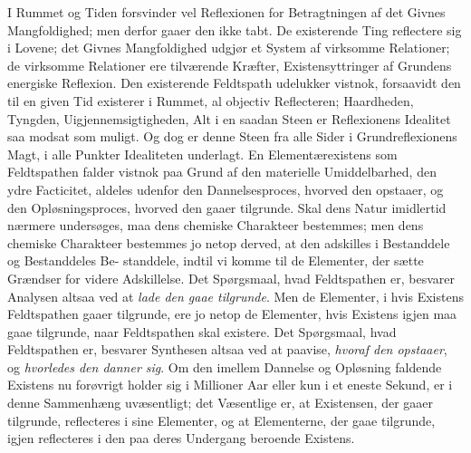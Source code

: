 \documentclass[12pt,a4paper]{book}
\begin{document}
I Rummet og Tiden forsvinder vel Reflexionen for
Betragtningen af det Givnes Mangfoldighed; men derfor
gaaer den ikke tabt. De existerende Ting reflectere sig i
Lovene; det Givnes Mangfoldighed udgjør et System af
virksomme Relationer; de virksomme Relationer ere tilværende
Kræfter, Existensyttringer af Grundens energiske Reflexion.
Den existerende Feldtspath udelukker vistnok, forsaavidt den
til en given Tid existerer i Rummet, al objectiv Reflecteren;
Haardheden, Tyngden, Uigjennemsigtigheden, Alt i en saadan
Steen er Reflexionens Idealitet saa modsat som muligt. Og
dog er denne Steen fra alle Sider i Grundreflexionens
Magt, i alle Punkter Idealiteten underlagt. En
Elementærexistens som Feldtspathen falder vistnok paa Grund af den
materielle Umiddelbarhed, den ydre Facticitet, aldeles udenfor
den Dannelsesproces, hvorved den opstaaer, og den
Opløsningsproces, hvorved den gaaer tilgrunde. Skal dens Natur
imidlertid nærmere undersøges, maa dens chemiske Charakteer
bestemmes; men dens chemiske Charakteer bestemmes jo netop
derved, at den adskilles i Bestanddele og Bestanddeles Be-
standdele, indtil vi komme til de Elementer, der sætte Grændser
for videre Adskillelse. Det Spørgsmaal, hvad Feldtspathen
er, besvarer Analysen altsaa ved at \emph{lade den gaae
tilgrunde}. Men de Elementer, i hvis Existens Feldtspathen
gaaer tilgrunde, ere jo netop de Elementer, hvis Existens
igjen maa gaae tilgrunde, naar Feldtspathen skal existere. Det
Spørgsmaal, hvad Feldtspathen er, besvarer Synthesen altsaa
ved at paavise, \emph{hvoraf den opstaaer}, og \emph{hvorledes den
danner sig}. Om den imellem Dannelse og Opløsning
faldende Existens nu forøvrigt holder sig i Millioner Aar eller
kun i et eneste Sekund, er i denne Sammenhæng
uvæsentligt; det Væsentlige er, at Existensen, der gaaer tilgrunde,
reflecteres i sine Elementer, og at Elementerne, der gaae
tilgrunde, igjen reflecteres i den paa deres Undergang beroende
Existens.
\end{document}
